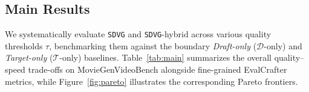 \documentclass{article} %
\newcommand{\threshold}{\tau}
\begin{document}
\subsection{Main Results}
\label{sec:main-results}

We systematically evaluate \texttt{SDVG} and \texttt{SDVG}-hybrid across various quality thresholds $\threshold$, benchmarking them against the boundary \emph{Draft-only} ($\mathcal{D}$-only) and \emph{Target-only} ($\mathcal{T}$-only) baselines. Table~\ref{tab:main} summarizes the overall quality--speed trade-offs on MovieGenVideoBench alongside fine-grained EvalCrafter metrics, while Figure~\ref{fig:pareto} illustrates the corresponding Pareto frontiers.
\end{document}
